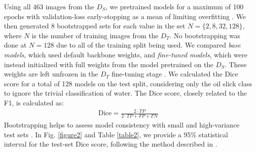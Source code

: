 \documentclass[journal]{IEEEtran}
\begin{document}
Using all 463 images from the $\mathit{D}_S$, we pretrained models for a maximum of 100 epochs with validation-loss early-stopping as a mean of limiting overfitting \cite{wangGeneralizingFewExamples2020}. 
We then generated 8 bootstrapped sets for each value in the set \( N = \{ 2, 8, 32, 128\} \), where \( N \) is the number of 
training images from the $\mathit{D}_T$. No bootstrapping was done at \( N = 128 \) due to all of the training split being used. We compared \textit{base models}, which used
default backbone weights, and \textit{fine-tuned models}, which were instead initialized with full weights from the model pretrained on the $\mathit{D}_S$. These weights are left unfrozen in the $\mathit{D}_T$ 
fine-tuning stage \cite{yosinskiHowTransferableAre2014}. We calculated the Dice score for a total of 128 models on the test split, considering only the oil slick class to ignore the trivial classification of water. 
The Dice score, closely related to the F1, is calculated as:
\begin{align}
    \text{Dice} = \frac{2 \cdot TP}{2 \cdot TP + FP + FN}
\end{align}
Bootstrapping helps to assess model consistency with small and high-variance test sets \cite{mollersenAccountingMultiplicityMachine2024}. In Fig. \ref{figure2} and Table \ref{table2},
we provide a 95\% statistical interval for the test-set Dice score, following the method described in \cite{burkovMachineLearningEngineering2020}.
\end{document}
